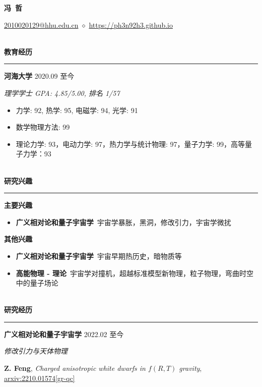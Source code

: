 \documentclass[12pt]{article}
\newcommand{\sect}[1]{
    ~\\ \noindent \textbf{#1} \medskip \hrule \medskip
}
\begin{document}
\pagestyle{empty}


\begin{center}
    \LARGE{\textbf{冯\ 哲}}
\end{center}

\begin{center}
    \href{mailto:2010020129@hhu.edu.cn}{2010020129@hhu.edu.cn} $\diamond$ \href{https://ph3n92h3.github.io}{https://ph3n92h3.github.io}
\end{center}


\sect{教育经历}

\textbf{河海大学} \hfill 2020.09 至今

\textit{理学学士 \hfill GPA: 4.85/5.00, 排名 1/57}

\begin{itemize}[noitemsep,nolistsep]
    \item 力学: 92, 热学: 95, 电磁学: 94, 光学: 91
    \item 数学物理方法: 99
    \item 理论力学: 93，电动力学: 97，热力学与统计物理: 97，量子力学: 99，高等量子力学：93
\end{itemize}


\sect{研究兴趣}

\textbf{主要兴趣}
\begin{itemize}[noitemsep,nolistsep]
    \item \textbf{广义相对论和量子宇宙学}\ 宇宙学暴胀，黑洞，修改引力，宇宙学微扰
\end{itemize}

\textbf{其他兴趣}
\begin{itemize}[noitemsep,nolistsep]
    \item \textbf{广义相对论和量子宇宙学}\ 宇宙早期热历史，暗物质等
    \item \textbf{高能物理 - 理论}\ 宇宙学对撞机，超越标准模型新物理，粒子物理，弯曲时空中的量子场论
\end{itemize}


\sect{研究经历}

\textbf{广义相对论和量子宇宙学} \hfill 2022.02 至今

\smallskip \quad \textit{修改引力与天体物理}

\textbf{Z. Feng}, \textit{Charged anisotropic white dwarfs in $f\left({R}, {T}\right)$ gravity}, \href{https://arxiv.org/abs/2210.01574}{arxiv:2210.01574[gr-qc]}
\end{document}
